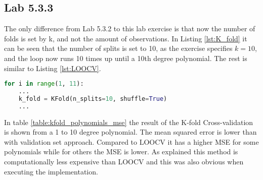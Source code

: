 
\FloatBarrier
\subsection{Lab 5.3.3}
The only difference from Lab 5.3.2 to this lab exercise is that now the number of folds is set by k, and not the amount of observations. In Listing \ref{lst:K_fold} it can be seen that the number of splits is set to 10, as the exercise specifies $k=10$, and the loop now runs 10 times up until a 10th degree polynomial. The rest is similar to Listing \ref{lst:LOOCV}.

\begin{lstlisting}[language=Python, label=lst:K_fold, caption=K-fold Cross-validation loop]
for i in range(1, 11):
	...
	k_fold = KFold(n_splits=10, shuffle=True) 
	...
\end{lstlisting}
\FloatBarrier
In table \ref{table:kfold_polynomials_mse} the result of the K-fold Cross-validation is shown from a 1 to 10 degree polynomial. The mean squared error is lower than with validation set approach. Compared to LOOCV it has a higher MSE for some polynomials while for others the MSE is lower. As explained this method is computationally less expensive than LOOCV and this was also obvious when executing the implementation.

\FloatBarrier


